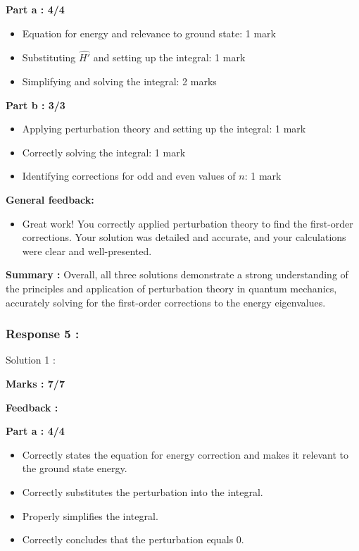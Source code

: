 \documentclass[a4paper,11pt]{article}
\begin{document}
\textbf{Part a : 4/4}

\begin{itemize}
    \item Equation for energy and relevance to ground state: 1 mark
    \item Substituting $\hat{H'}$ and setting up the integral: 1 mark
    \item Simplifying and solving the integral: 2 marks
\end{itemize}


\textbf{Part b : 3/3}

\begin{itemize}
    \item Applying perturbation theory and setting up the integral: 1 mark
    \item Correctly solving the integral: 1 mark
    \item Identifying corrections for odd and even values of $n$: 1 mark
\end{itemize}

\textbf{General feedback:}

\begin{itemize}
    \item Great work! You correctly applied perturbation theory to find the first-order corrections. Your solution was detailed and accurate, and your calculations were clear and well-presented.
\end{itemize}


\textbf{Summary :}
Overall, all three solutions demonstrate a strong understanding of the principles and application of perturbation theory in quantum mechanics, accurately solving for the first-order corrections to the energy eigenvalues.


\subsubsection*{Response 5 :}

Solution 1 :

\textbf{Marks : 7/7}

\textbf{Feedback :}

\textbf{Part a : 4/4}

\begin{itemize}
    \item Correctly states the equation for energy correction and makes it relevant to the ground state energy.
    \item Correctly substitutes the perturbation into the integral.
    \item Properly simplifies the integral.
    \item Correctly concludes that the perturbation equals 0.
\end{itemize}
\end{document}
